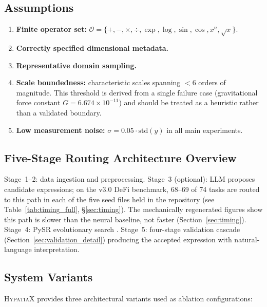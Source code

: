 \documentclass[twoside,11pt]{article}
\begin{document}
\subsection{Assumptions}\label{subsec:assumptions}
\label{sec:assumptions}

\begin{enumerate}
\item \textbf{Finite operator set:}
  $\mathcal{O} = \{+,-,\times,\div,\exp,\log,\sin,\cos,x^n,\sqrt{x}\}$.
\item \textbf{Correctly specified dimensional metadata.}
\item \textbf{Representative domain sampling.}
\item \textbf{Scale boundedness:} characteristic scales spanning
  $<6$ orders of magnitude.
  This threshold is derived from a single failure case (gravitational force
  constant $G = 6.674 \times 10^{-11}$) and should be treated as a heuristic
  rather than a validated boundary.
\item \textbf{Low measurement noise:}
  $\sigma = 0.05 \cdot \mathrm{std}(y)$ in all main experiments.
\end{enumerate}

\subsection{Five-Stage Routing Architecture Overview}\label{subsec:fivestage-routing-architecture-overview}
\label{sec:validation_framework}

Stage~1--2: data ingestion and preprocessing.
Stage~3 (optional): LLM proposes candidate expressions; on the v3.0 DeFi
benchmark, 68--69 of 74 tasks are routed to this path in each of the five
seed files held in the repository (see
Table~\ref{tab:timing_full}, \S\ref{sec:timing}). The mechanically regenerated figures show this path is slower than the neural baseline, not faster
(Section~\ref{sec:timing}).
Stage~4: PySR evolutionary search \citep{cranmer2023pysr}.
Stage~5: four-stage validation cascade (Section~\ref{sec:validation_detail})
producing the accepted expression with natural-language interpretation.

\subsection{System Variants}\label{subsec:system-variants}
\label{sec:arch_variants}

\textsc{HypatiaX} provides three architectural variants used as ablation
configurations:
\end{document}

